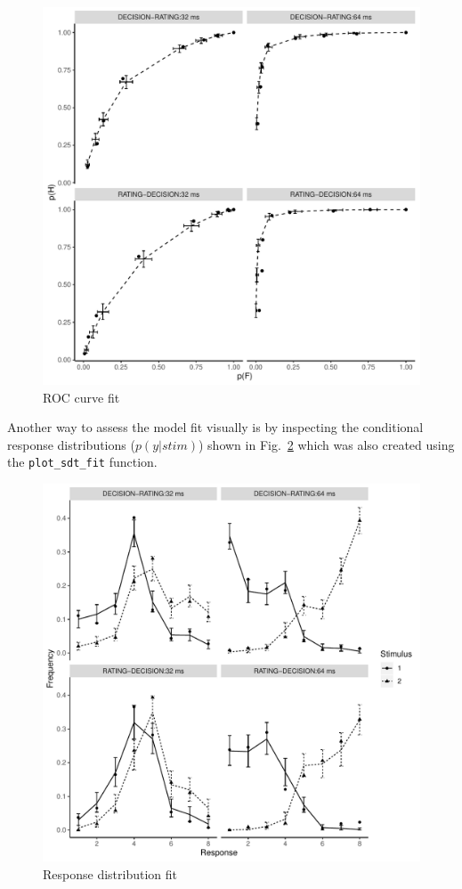 \documentclass[oneside,a4paper]{article}
\begin{document}
\begin{figure}[H]
  \centering
  \includegraphics[width=.8\linewidth]{roc_fit.pdf}
  \caption{ROC curve fit}
  \label{fig:3}
\end{figure}


Another way to assess the model fit visually is by inspecting the
conditional response distributions ($p(y|stim)$) shown in
Fig.~\ref{fig:4} which was also created using the
\texttt{plot\_sdt\_fit} function.

\begin{figure}[H]
  \centering
  \includegraphics[width=.8\linewidth]{response_fit.pdf}
  \caption{Response distribution fit}
  \label{fig:4}
\end{figure}
\end{document}
